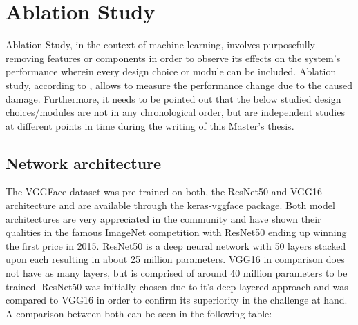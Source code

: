 
\section{Ablation Study}
Ablation Study, in the context of machine learning, involves purposefully removing features or components in order to observe its effects on the system's performance wherein every design choice or module can be included. Ablation study, according to \citet{Fadelli:2018:AblationInANN}, allows to measure the performance change due to the caused damage.
\newline\newline
Furthermore, it needs to be pointed out that the below studied design choices/modules are not in any chronological order, but are independent studies at different points
in time during the writing of this Master’s thesis.

\subsection{Network architecture}
The VGGFace dataset was pre-trained on both, the ResNet50 and VGG16 architecture and are available through the keras-vggface package. Both model architectures are very appreciated in the community and have shown their qualities in the famous ImageNet competition with ResNet50 ending up winning the first price in 2015. ResNet50 is a deep neural network with 50 layers stacked upon each resulting in about 25 million parameters. VGG16 in comparison does not have as many layers, but is comprised of around 40 million parameters to be trained.
\newline\newline
ResNet50 was initially chosen due to it's deep layered approach and was compared to VGG16 in order to confirm its superiority in the challenge at hand. A comparison between both can be seen in the following table:

